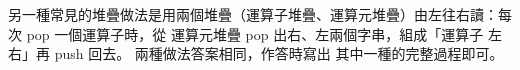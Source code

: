 \begin{pastsoln}
另一種常見的堆疊做法是用兩個堆疊（運算子堆疊、運算元堆疊）由左往右讀：每次 pop 一個運算子時，從
運算元堆疊 pop 出右、左兩個字串，組成「運算子 左 右」再 push 回去。 兩種做法答案相同，作答時寫出
其中一種的完整過程即可。
\end{pastsoln}
